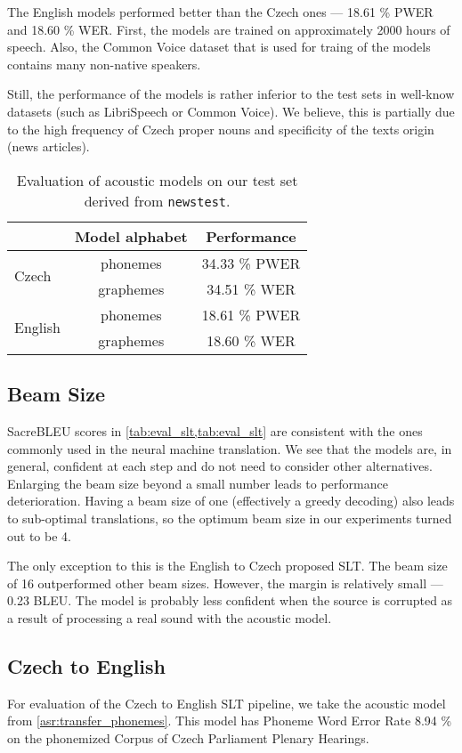 The English models performed better than the Czech ones --- 18.61 \% PWER and 18.60 \% WER. First, the models are trained on approximately 2000 hours of speech. Also, the Common Voice dataset that is used for traing of the models contains many non-native speakers.

Still, the performance of the models is rather inferior to the test sets in well-know datasets (such as LibriSpeech or Common Voice). We believe, this is partially due to the high frequency of Czech proper nouns and specificity of the texts origin (news articles). 

\begin{table}[t]
	\centering
	\begin{tabular}{lc|c}
		& Model alphabet & Performance   \\ \hline
		\multirow{2}{*}{Czech}   & phonemes       & 34.33 \% PWER \\
		& graphemes      & 34.51 \% WER  \\ \hline
		\multirow{2}{*}{English} & phonemes       & 18.61 \% PWER \\
		& graphemes      & 18.60 \% WER 
	\end{tabular}
	\caption[Acoustic models performance on \texttt{read-newstest}]{Evaluation of acoustic models on our test set derived from \texttt{news\-test}.}
	\label{tab:acoustic_eval}
\end{table}

\subsection{Beam Size} 
SacreBLEU scores in \cref{tab:eval_slt,tab:eval_slt} are consistent with the ones commonly used in the neural machine translation. We see that the models are, in general, confident at each step and do not need to consider other alternatives. Enlarging the beam size beyond a small number leads to performance deterioration. Having a beam size of one (effectively a greedy decoding) also leads to sub-optimal translations, so the optimum beam size in our experiments turned out to be 4.

The only exception to this is the English to Czech proposed SLT. The beam size of 16 outperformed other beam sizes. However, the margin is relatively small --- 0.23 BLEU. The model is probably less confident when the source is corrupted as a result of processing a real sound with the acoustic model.

\subsection{Czech to English}
For evaluation of the Czech to English SLT pipeline, we take the acoustic model from \cref{asr:transfer_phonemes}. This model has Phoneme Word Error Rate 8.94 \% on the phonemized Corpus of Czech Parliament Plenary Hearings.

